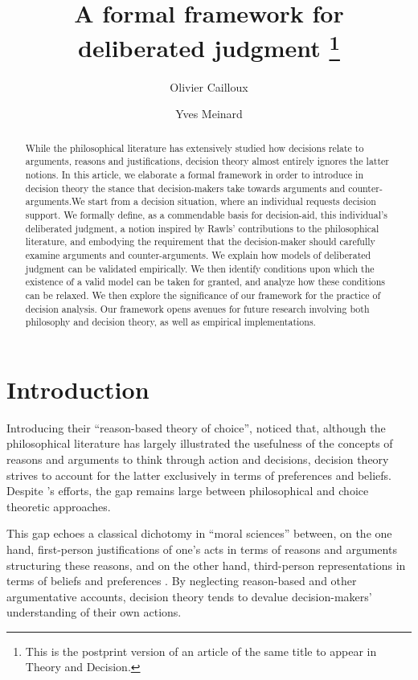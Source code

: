 \documentclass[version=3.21, pagesize, twoside=off, bibliography=totoc, DIV=calc, fontsize=12pt, a4paper]{scrartcl}
\title{A formal framework for deliberated judgment%
	\thanks{This is the postprint version of an article of the same title to appear in Theory and Decision.}%
}
\author{Olivier Cailloux}
\author{Yves Meinard}
\affil{Université Paris-Dauphine, PSL Research University, CNRS, LAMSADE, 75016 PARIS, FRANCE\\
	\href{mailto:olivier.cailloux@dauphine.fr}{olivier.cailloux@dauphine.fr}
}
\begin{document}
\maketitle

\begin{abstract}
While the philosophical literature has extensively studied how decisions relate to arguments, reasons and justifications, decision theory almost entirely ignores the latter notions.
In this article, we elaborate a formal framework in order to introduce in decision theory the stance that decision-makers take towards arguments and counter-arguments.We start from a decision situation, where an individual requests decision support. We formally define, as a commendable basis for decision-aid, this individual’s deliberated judgment, a notion inspired by Rawls' contributions to the philosophical literature, and embodying the requirement that the decision-maker should carefully examine arguments and counter-arguments.  
We explain how models of deliberated judgment can be validated empirically.
We then identify conditions upon which the existence of a valid model can be taken for granted, and analyze how these conditions can be relaxed.
We then explore the significance of our framework for the practice of decision analysis.
Our framework opens avenues for future research involving both philosophy and decision theory, as well as empirical implementations. 
\end{abstract}

\section{Introduction}
\label{sec:intro}

Introducing their “reason-based theory of choice”, \citet{dietrich_reason-based_2013} noticed that, although the philosophical literature has largely illustrated the usefulness of the concepts of reasons and arguments to think through action and decisions, decision theory strives to account for the latter exclusively in terms of preferences and beliefs. Despite \citeauthor{dietrich_reason-based_2013}’s \citeyearpar{dietrich_reason-based_2013, dietrich_reason-based_2016} efforts, the gap remains large between philosophical and choice theoretic approaches.

This gap echoes a classical dichotomy in “moral sciences” between, on the one hand, first-person justifications of one's acts in terms of reasons and arguments structuring these reasons, and on the other hand, third-person representations in terms of beliefs and preferences \citep{hausman_preference_2011}. By neglecting reason-based and other argumentative accounts, decision theory tends to devalue decision-makers' understanding of their own actions.
\end{document}
